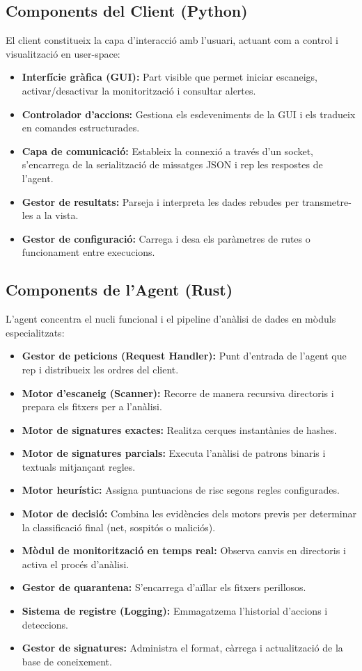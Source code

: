 \documentclass[12pt,a4paper]{report}
\begin{document}
\subsection{Components del Client (Python)}
El client constitueix la capa d'interacció amb l'usuari, actuant com a control i visualització en user-space:
\begin{itemize}
    \item \textbf{Interfície gràfica (GUI):} Part visible que permet iniciar escaneigs, activar/desactivar la monitorització i consultar alertes.
    \item \textbf{Controlador d'accions:} Gestiona els esdeveniments de la GUI i els tradueix en comandes estructurades.
    \item \textbf{Capa de comunicació:} Estableix la connexió a través d'un socket, s'encarrega de la serialització de missatges JSON i rep les respostes de l'agent.
    \item \textbf{Gestor de resultats:} Parseja i interpreta les dades rebudes per transmetre-les a la vista.
    \item \textbf{Gestor de configuració:} Carrega i desa els paràmetres de rutes o funcionament entre execucions.
\end{itemize}

\subsection{Components de l'Agent (Rust)}
L'agent concentra el nucli funcional i el pipeline d'anàlisi de dades en mòduls especialitzats:
\begin{itemize}
    \item \textbf{Gestor de peticions (Request Handler):} Punt d'entrada de l'agent que rep i distribueix les ordres del client.
    \item \textbf{Motor d'escaneig (Scanner):} Recorre de manera recursiva directoris i prepara els fitxers per a l'anàlisi.
    \item \textbf{Motor de signatures exactes:} Realitza cerques instantànies de hashes.
    \item \textbf{Motor de signatures parcials:} Executa l'anàlisi de patrons binaris i textuals mitjançant regles.
    \item \textbf{Motor heurístic:} Assigna puntuacions de risc segons regles configurades.
    \item \textbf{Motor de decisió:} Combina les evidències dels motors previs per determinar la classificació final (net, sospitós o maliciós).
    \item \textbf{Mòdul de monitorització en temps real:} Observa canvis en directoris i activa el procés d'anàlisi.
    \item \textbf{Gestor de quarantena:} S'encarrega d'aïllar els fitxers perillosos.
    \item \textbf{Sistema de registre (Logging):} Emmagatzema l'historial d'accions i deteccions.
    \item \textbf{Gestor de signatures:} Administra el format, càrrega i actualització de la base de coneixement.
\end{itemize}
\end{document}
